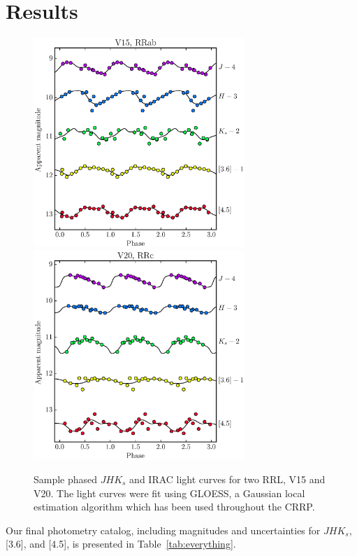 \documentclass[a4paper,fleqn,usenatbib]{mnras}
\begin{document}
\section{Results}
\label{sec:results}

\begin{figure}
\begin{center}
\includegraphics[width=80mm]{../ocen_only_fitting/final_plots/V15_light_curves.eps}
\includegraphics[width=80mm]{../ocen_only_fitting/final_plots/V20_light_curves.eps}
\caption{Sample phased $J\!H\!K_s$ and IRAC light curves for two RRL, V15 and V20. The light curves were fit using GLOESS, a Gaussian local estimation
algorithm which has been used throughout the CRRP.} 
\label{fig:light_curves}
\end{center}
\end{figure}

Our final photometry catalog, including magnitudes and uncertainties for $J\!H\!K_s$, [3.6], and [4.5], is presented in Table~\ref{tab:everything}.
\end{document}
